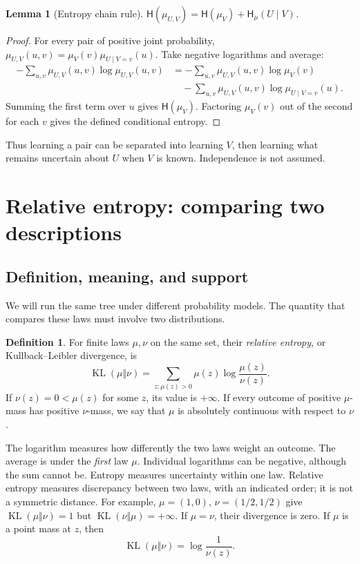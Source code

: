 \documentclass[11pt]{article}
\newtheorem{lemma}[theorem]{Lemma}
\theoremstyle{definition}
\newtheorem{definition}[theorem]{Definition}
\theoremstyle{remark}
\newcommand{\Ent}{\mathsf H}
\newcommand{\KL}{\operatorname{KL}}
\numberwithin{equation}{section}
\begin{document}
\begin{lemma}[Entropy chain rule]\label{lem:entropychain}
\(\Ent(\mu_{U,V})=\Ent(\mu_V)+\Ent_\mu(U\mid V)\).
\end{lemma}
\begin{proof}
For every pair of positive joint probability,
\(\mu_{U,V}(u,v)=\mu_V(v)\mu_{U\mid V=v}(u)\).
Take negative logarithms and average:
\begin{align*}
 -\sum_{u,v}\mu_{U,V}(u,v)\log\mu_{U,V}(u,v)
 &=-\sum_{u,v}\mu_{U,V}(u,v)\log\mu_V(v)\\
 &\quad-\sum_{u,v}\mu_{U,V}(u,v)
                       \log\mu_{U\mid V=v}(u).
\end{align*}
Summing the first term over \(u\) gives \(\Ent(\mu_V)\).
Factoring \(\mu_V(v)\) out of the second for each \(v\) gives
the defined conditional entropy.
\end{proof}

Thus learning a pair can be separated into learning \(V\), then
learning what remains uncertain about \(U\) when \(V\) is known.
Independence is not assumed.

\section{Relative entropy: comparing two descriptions}\label{sec:KL}

\subsection{Definition, meaning, and support}

We will run the same tree under different probability models.
The quantity that compares these laws must involve two distributions.

\begin{definition}
For finite laws \(\mu,\nu\) on the same set, their \emph{relative
entropy}, or Kullback--Leibler divergence, is
\[
 \KL(\mu\Vert\nu)=\sum_{z:\mu(z)>0}\mu(z)\log\frac{\mu(z)}{\nu(z)}.
\]
If \(\nu(z)=0<\mu(z)\) for some \(z\), its value is \(+\infty\).
If every outcome of positive \(\mu\)-mass has positive \(\nu\)-mass,
we say that \(\mu\) is absolutely continuous with respect to \(\nu\).
\end{definition}

The logarithm measures how differently the two laws weight an outcome.
The average is under the \emph{first} law \(\mu\).
Individual logarithms can be negative, although the sum cannot be.
Entropy measures uncertainty within one law. Relative entropy measures
discrepancy between two laws, with an indicated order; it is not a
symmetric distance.
For example, \(\mu=(1,0)\), \(\nu=(1/2,1/2)\) give
\(\KL(\mu\Vert\nu)=1\) but \(\KL(\nu\Vert\mu)=+\infty\).
If \(\mu=\nu\), their divergence is zero.
If \(\mu\) is a point mass at \(z\), then
\begin{equation}\label{eq:pointKL}
 \KL(\mu\Vert\nu)=\log\frac1{\nu(z)}.
\end{equation}
\end{document}
